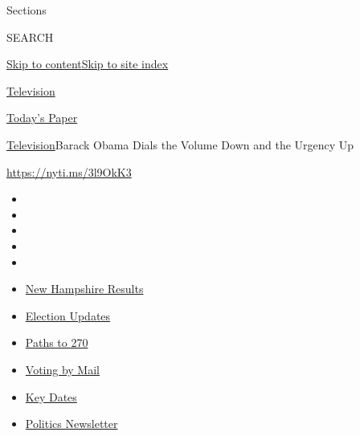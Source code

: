 Sections

SEARCH

\protect\hyperlink{site-content}{Skip to
content}\protect\hyperlink{site-index}{Skip to site index}

\href{https://www.nytimes3xbfgragh.onion/section/arts/television}{Television}

\href{https://myaccount.nytimes3xbfgragh.onion/auth/login?response_type=cookie\&client_id=vi}{}

\href{https://www.nytimes3xbfgragh.onion/section/todayspaper}{Today's
Paper}

\href{/section/arts/television}{Television}\textbar{}Barack Obama Dials
the Volume Down and the Urgency Up

\url{https://nyti.ms/3l9OkK3}

\begin{itemize}
\item
\item
\item
\item
\item
\end{itemize}

\begin{itemize}
\item
  \href{https://www.nytimes3xbfgragh.onion/interactive/2020/09/08/us/elections/results-new-hampshire-primary-elections.html?action=click\&pgtype=Article\&state=default\&region=TOP_BANNER\&context=storylines_menu}{New
  Hampshire Results}
\item
  \href{https://www.nytimes3xbfgragh.onion/live/2020/09/08/us/trump-vs-biden?action=click\&pgtype=Article\&state=default\&region=TOP_BANNER\&context=storylines_menu}{Election
  Updates}
\item
  \href{https://www.nytimes3xbfgragh.onion/interactive/2020/us/elections/election-states-biden-trump.html?action=click\&pgtype=Article\&state=default\&region=TOP_BANNER\&context=storylines_menu}{Paths
  to 270}
\item
  \href{https://www.nytimes3xbfgragh.onion/interactive/2020/08/31/us/politics/vote-by-mail-deadlines.html?action=click\&pgtype=Article\&state=default\&region=TOP_BANNER\&context=storylines_menu}{Voting
  by Mail}
\item
  \href{https://www.nytimes3xbfgragh.onion/interactive/2019/us/elections/2020-presidential-election-calendar.html?action=click\&pgtype=Article\&state=default\&region=TOP_BANNER\&context=storylines_menu}{Key
  Dates}
\item
  \href{https://www.nytimes3xbfgragh.onion/newsletters/politics?action=click\&pgtype=Article\&state=default\&region=TOP_BANNER\&context=storylines_menu}{Politics
  Newsletter}
\end{itemize}

